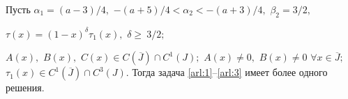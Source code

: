 \smallskip



\begin{theorem}[4]Пусть \mbox{$\alpha_1=({a-3})/{4},$} \mbox{$-({a+5})/{4}<\alpha_2<-({a+3})/{4},$} \mbox{$\beta_2=3/2,$} %

$\tau(x)=(1-x)^{\delta}\tau_1(x),$ $\delta\geq\ 3/2;$ 

$A(x),$ $B(x),$ $C(x)\in C(\overline J)\cap C^1(J);$ $A(x)\neq 0,$ $B(x)\neq 0$ $\forall x\in \overline{J};$ $\tau_1(x)\in C^1(\overline J)\cap C^3(J).$ Тогда задача \eqref{arl:1}--\eqref{arl:3} имеет более одного решения$.$


\end{theorem}



